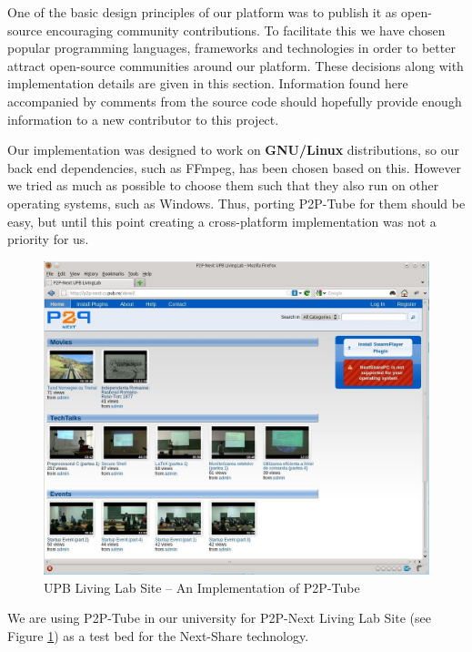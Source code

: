 One of the basic design principles of our platform was to publish it as open-source encouraging community contributions. To facilitate this we have chosen popular programming languages, frameworks and technologies in order to better attract open-source communities around our platform. These decisions along with implementation details are given in this section. Information found here accompanied by comments from the source code should hopefully provide enough information to a new contributor to this project.

Our implementation was designed to work on \textbf{GNU/Linux} distributions, so our back end dependencies, such as FFmpeg, has been chosen based on this. However we tried as much as possible to choose them such that they also run on other operating systems, such as Windows. Thus, porting P2P-Tube for them should be easy, but until this point creating a cross-platform implementation was not a priority for us.

\begin{figure}[h]
  \begin{center}
    \includegraphics[width=\columnwidth]{img/living-lab-site.jpg}
  \end{center}
  \caption{UPB Living Lab Site -- An Implementation of P2P-Tube}
  \label{fig:living-lab-site}
\end{figure}

We are using P2P-Tube in our university for P2P-Next Living Lab Site (see Figure \ref{fig:living-lab-site})  as a test bed for the Next-Share technology.

